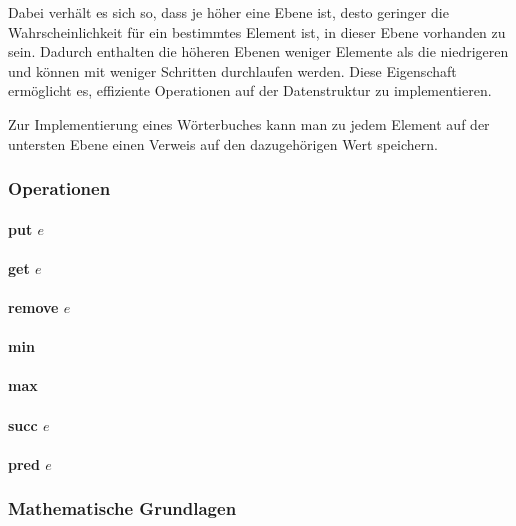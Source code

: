 Dabei verhält es sich so, dass je höher eine Ebene ist,
desto geringer die Wahrscheinlichkeit für ein bestimmtes Element ist, in dieser Ebene vorhanden zu sein.
Dadurch enthalten die höheren Ebenen weniger Elemente als die niedrigeren und können mit weniger Schritten durchlaufen werden.
Diese Eigenschaft ermöglicht es, effiziente Operationen auf der Datenstruktur zu implementieren.

Zur Implementierung eines Wörterbuches kann man zu jedem Element auf der untersten Ebene einen Verweis auf den dazugehörigen Wert speichern.

\subsubsection{Operationen}

\paragraph{put $e$}
\paragraph{get $e$}
\paragraph{remove $e$}
\paragraph{min}
\paragraph{max}
\paragraph{succ $e$}
\paragraph{pred $e$}

\subsubsection{Mathematische Grundlagen}
